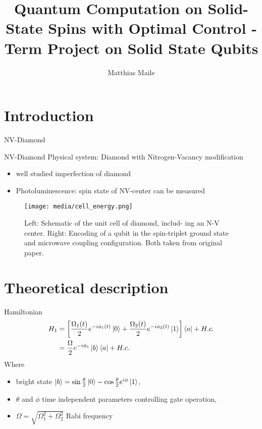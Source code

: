 \documentclass[aspectratio=1610, 9pt]{beamer}
\title{Quantum Computation on
Solid-State Spins with Optimal Control - Term Project on Solid State Qubits}
\author[M.~Maile]{Matthias Maile}
\institute[TU Dortmund, KAIST]{TU Dortmund, KAIST}
\begin{document}
\maketitle

\section{Introduction}
\label{sec:Introduction}

\begin{frame}{NV-Diamond}
\begin{block}{NV-Diamond}
  Physical system: Diamond with Nitrogen-Vacancy modification
  \begin{itemize}
    \item well studied imperfection of diamond
    \item Photoluminescence: spin state of NV-center can be measured
  \end{itemize}
\end{block}
\end{frame}

\begin{frame}
   \begin{figure}
    \centering
    \texttt{[image: media/cell\_energy.png]}
    \caption{Left: Schematic of the unit cell of diamond, includ-
ing an N-V center. Right: Encoding of a qubit in the spin-triplet
ground state and microwave coupling conﬁguration. Both taken from original paper.}
    \label{fig:NV-center}
  \end{figure}
\end{frame}

\section{Theoretical description}
\label{sec:theory}

\begin{frame}{}
  \begin{block}{Hamiltonian}
    \begin{align*}
      H_1 &= \left[
        \frac{\Omega_1(t)}{2} e^{-i\phi_1(t)} \ket{0} + \frac{\Omega_2(t)}{2} e^{-i\phi_2(t)}
      \ket{1} \right] \bra{a} + H.c. \\
          &= \frac{\Omega}{2} e^{-i\phi_1} \ket{b}\bra{a} + H.c.
    \end{align*}
    Where
    \begin{itemize}
      \item bright state $\ket{b} = \sin\frac{\theta}{2} \ket{0} - \cos\frac{\theta}{2}
      e^{i\phi} \ket{1}$, 
    \item $\theta$ and $\phi$ time independent parameters controlling gate operation,
    \item $\Omega = \sqrt{\Omega_1^2 + \Omega_2^2}$ Rabi frequency
    \end{itemize}
  \end{block}
\end{frame}
\end{document}
